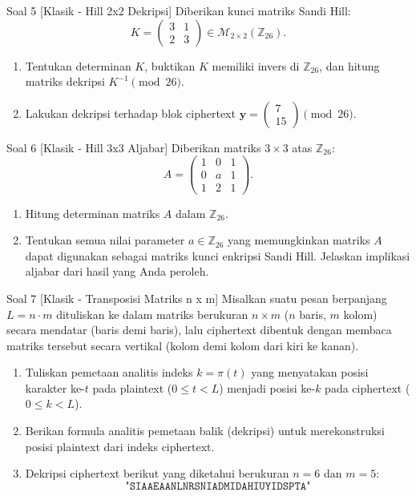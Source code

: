 \documentclass[11pt,a4paper]{article}
\begin{document}
\begin{soalklasik}{Soal 5 [Klasik - Hill 2x2 Dekripsi]}
Diberikan kunci matriks Sandi Hill:
\[
K = \begin{pmatrix} 3 & 1 \\ 2 & 3 \end{pmatrix} \in \mathcal{M}_{2 \times 2}(\mathbb{Z}_{26}).
\]
\begin{enumerate}[label=(\alph*)]
    \item Tentukan determinan $K$, buktikan $K$ memiliki invers di $\mathbb{Z}_{26}$, dan hitung matriks dekripsi $K^{-1} \pmod{26}$.
    \item Lakukan dekripsi terhadap blok ciphertext $\mathbf{y} = \begin{pmatrix} 7 \\ 15 \end{pmatrix} \pmod{26}$.
\end{enumerate}
\end{soalklasik}

\begin{soalklasik}{Soal 6 [Klasik - Hill 3x3 Aljabar]}
Diberikan matriks $3 \times 3$ atas $\mathbb{Z}_{26}$:
\[
A = \begin{pmatrix} 1 & 0 & 1 \\ 0 & a & 1 \\ 1 & 2 & 1 \end{pmatrix}.
\]
\begin{enumerate}[label=(\alph*)]
    \item Hitung determinan matriks $A$ dalam $\mathbb{Z}_{26}$.
    \item Tentukan semua nilai parameter $a \in \mathbb{Z}_{26}$ yang memungkinkan matriks $A$ dapat digunakan sebagai matriks kunci enkripsi Sandi Hill. Jelaskan implikasi aljabar dari hasil yang Anda peroleh.
\end{enumerate}
\end{soalklasik}

\begin{soalklasik}{Soal 7 [Klasik - Transposisi Matriks n x m]}
Misalkan suatu pesan berpanjang $L = n \cdot m$ dituliskan ke dalam matriks berukuran $n \times m$ ($n$ baris, $m$ kolom) secara mendatar (baris demi baris), lalu ciphertext dibentuk dengan membaca matriks tersebut secara vertikal (kolom demi kolom dari kiri ke kanan).
\begin{enumerate}[label=(\alph*)]
    \item Tuliskan pemetaan analitis indeks $k = \pi(t)$ yang menyatakan posisi karakter ke-$t$ pada plaintext ($0 \le t < L$) menjadi posisi ke-$k$ pada ciphertext ($0 \le k < L$).
    \item Berikan formula analitis pemetaan balik (dekripsi) untuk merekonstruksi posisi plaintext dari indeks ciphertext.
    \item Dekripsi ciphertext berikut yang diketahui berukuran $n = 6$ dan $m = 5$:
    \[
    \texttt{"SIAAEAANLNRSNIADMIDAHIUYIDSPTA"}
    \]
\end{enumerate}
\end{soalklasik}
\end{document}
